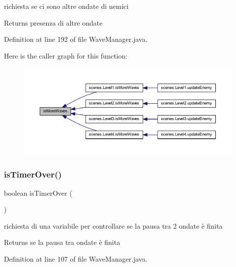 richiesta se ci sono altre ondate di nemici 

\begin{DoxyReturn}{Returns}
presenza di altre ondate 
\end{DoxyReturn}


Definition at line 192 of file Wave\+Manager.\+java.

Here is the caller graph for this function\+:\nopagebreak
\begin{figure}[H]
\begin{center}
\leavevmode
\includegraphics[width=350pt]{classmanagers_1_1_wave_manager_a999f12a033f49f299ad7f55bcae24447_icgraph}
\end{center}
\end{figure}
\mbox{\label{classmanagers_1_1_wave_manager_ab68417e6738c05037923f5f0f21eb586}} 
\subsubsection{\texorpdfstring{is\+Timer\+Over()}{isTimerOver()}}
{\footnotesize\ttfamily boolean is\+Timer\+Over (\begin{DoxyParamCaption}{ }\end{DoxyParamCaption})}



richiesta di una variabile per controllare se la pausa tra 2 ondate è finita 

\begin{DoxyReturn}{Returns}
se la pausa tra ondate è finita 
\end{DoxyReturn}


Definition at line 107 of file Wave\+Manager.\+java.

